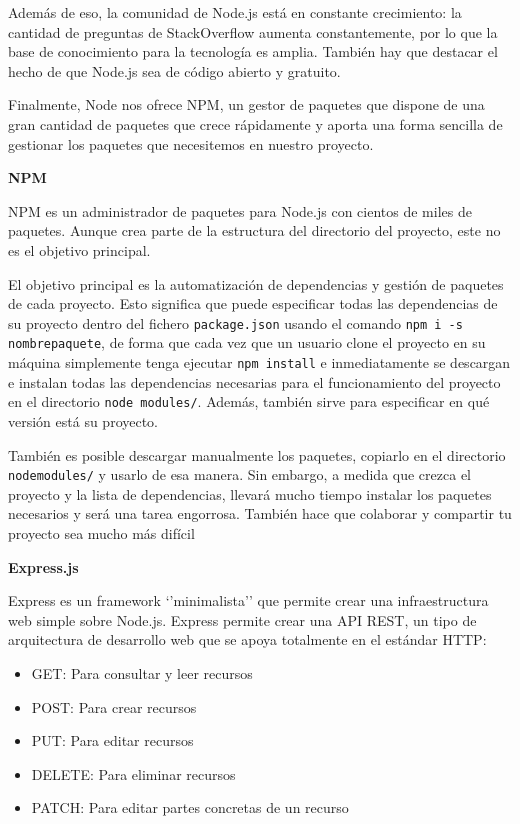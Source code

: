 Además de eso, la comunidad de Node.js está en constante crecimiento: la cantidad de preguntas de StackOverflow aumenta constantemente, por lo que la base de conocimiento para la tecnología es amplia. También hay que destacar el hecho de que Node.js sea de código abierto y gratuito. 

Finalmente, Node nos ofrece NPM, un gestor de paquetes que dispone de una gran cantidad de paquetes que crece rápidamente y aporta una forma sencilla de gestionar los paquetes que necesitemos en nuestro proyecto.

{\bf NPM}

NPM \cite{B18} es un administrador de paquetes para Node.js con cientos de miles de paquetes. Aunque crea parte de la estructura del directorio del proyecto, este no es el objetivo principal.

El objetivo principal es la automatización de dependencias y gestión de paquetes de cada proyecto. Esto significa que puede especificar todas las dependencias de su proyecto dentro del fichero \verb|package.json| usando el comando 
\verb|npm i -s nombrepaquete|, de forma que cada vez que un usuario clone el proyecto en su máquina simplemente tenga ejecutar \verb|npm install| e inmediatamente se descargan e instalan todas las dependencias necesarias para el funcionamiento del proyecto en el directorio \verb|node modules/|. Además, también sirve para especificar en qué versión está su proyecto.

También es posible descargar manualmente los paquetes, copiarlo en el directorio \verb|nodemodules/| y usarlo de esa manera. Sin embargo, a medida que crezca el proyecto y la lista de dependencias, llevará mucho tiempo instalar los paquetes necesarios y será una tarea engorrosa. También hace que colaborar y compartir tu proyecto sea mucho más difícil

{\bf Express.js}

Express es un framework ‘’minimalista’’ que permite crear una infraestructura web simple sobre Node.js. Express permite crear una API REST, un tipo de arquitectura de desarrollo web que se apoya totalmente en el estándar HTTP:

\begin{itemize}
  \item GET: Para consultar y leer recursos
  \item POST: Para crear recursos
  \item PUT: Para editar recursos
  \item DELETE: Para eliminar recursos
  \item PATCH: Para editar partes concretas de un recurso
\end{itemize}

